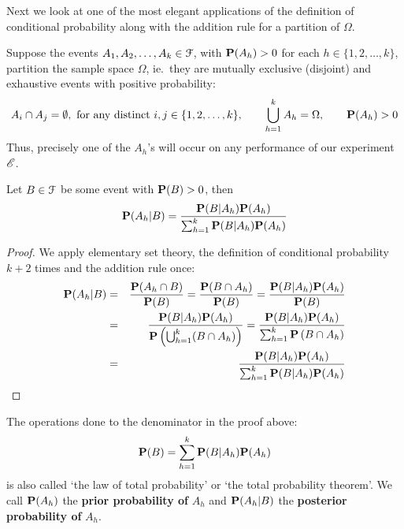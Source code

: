  Next we look at one of the most elegant applications of the definition of conditional probability along with the addition rule for a partition of $\Omega$.
 \begin{prop}
 Suppose the events $A_1,A_2,\ldots,A_k \in \mathcal{F}$, with $\mathbf{P}(A_h)>0$ for each $h \in \{1,2,\ldots,k\}$, partition the sample space $\Omega$, ie.~they are mutually exclusive (disjoint) and exhaustive events with positive probability: 
 \[
 A_i \cap A_j = \emptyset, \ \text{for any distinct $i,j \in \{1,2,\ldots,k\}$}, \qquad \bigcup_{h=1}^k A_h = \Omega, \qquad \mathbf{P}(A_h) > 0
 \]
 Thus, precisely one of the $A_h$'s will occur on any performance of our experiment $\mathscr{E}$.  
 
 Let $B \in \mathcal{F}$ be some event with $\mathbf{P}(B) > 0$, then 
 \begin{equation}\label{E:BayesThm}
 \mathbf{P}(A_h|B) = \frac{\mathbf{P}(B|A_h) \mathbf{P}(A_h)}{\sum_{h=1}^k \mathbf{P}(B|A_h) \mathbf{P}(A_h)}
 \end{equation}
 {\scriptsize
 \begin{proof}
 We apply elementary set theory, the definition of conditional probability $k+2$ times and the addition rule once:
 \begin{eqnarray}
 \mathbf{P}(A_h | B) &=& \frac{\mathbf{P}(A_h \cap B)}{\mathbf{P}(B)} = \frac{\mathbf{P}( B \cap A_h)}{\mathbf{P}(B)} = 
 \frac{\mathbf{P}( B | A_h) \mathbf{P}(A_h)}{\mathbf{P}(B)}  \notag \\
 &=& \frac{\mathbf{P}( B | A_h) \mathbf{P}(A_h)}{\mathbf{P} \left( \bigcup_{h=1}^k (B \cap A_h) \right)} =
 \frac{\mathbf{P}( B | A_h) \mathbf{P}(A_h)}{\sum_{h=1}^k \mathbf{P} \left( B \cap A_h \right)} \notag \\
 &=& \frac{\mathbf{P}( B | A_h) \mathbf{P}(A_h)}{\sum_{h=1}^k \mathbf{P}(B | A_h) \mathbf{P}(A_h)} \notag
 \end{eqnarray}
 \end{proof}
}
The operations done to the denominator in the proof above:
\begin{equation}\label{E:LTP}
\mathbf{P}( B) = \sum_{h=1}^k \mathbf{P}(B | A_h) \mathbf{P}(A_h)
\end{equation}
is also called `the law of total probability' or `the total probability theorem'.  
We call $\mathbf{P}(A_h)$ the {\bf prior probability of} $A_h$ and $\mathbf{P}(A_h|B)$ the {\bf posterior probability of} $A_h$.
 \end{prop}

